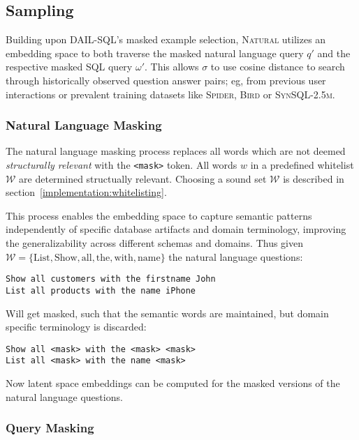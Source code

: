 \subsection{Sampling}\label{design:sampling}

Building upon DAIL-SQL's masked example selection, \textsc{Natural} utilizes an
embedding space to both traverse the masked natural language query $q'$
and the respective masked SQL query $\omega'$. This allows $\sigma$ to use
cosine distance to search through historically observed question answer pairs;
eg, from previous user interactions or prevalent training datasets like
\textsc{Spider}, \textsc{Bird} or \textsc{SynSQL-2.5m}.

\subsubsection{Natural Language Masking}

The natural language masking process replaces all words which are not deemed
\textit{structurally relevant} with the \texttt{<mask>} token. All words $w$
in a predefined whitelist $\mathcal{W}$ are determined structually relevant.
Choosing a sound set $\mathcal{W}$ is described in section~\ref{implementation:whitelisting}.

This process enables the embedding space to capture semantic patterns independently
of specific database artifacts and domain terminology, improving the generalizability
across different schemas and domains. Thus given $\mathcal{W} = \{\text{List},
\text{Show}, \text{all}, \text{the}, \text{with}, \text{name}\}$ the natural language
questions:

\begin{verbatim}
Show all customers with the firstname John
List all products with the name iPhone
\end{verbatim}

Will get masked, such that the semantic words are maintained, but domain specific
terminology is discarded:

\begin{verbatim}
Show all <mask> with the <mask> <mask>
List all <mask> with the name <mask>
\end{verbatim}

Now latent space embeddings can be computed for the masked versions of the natural
language questions.

\subsubsection{Query Masking}

